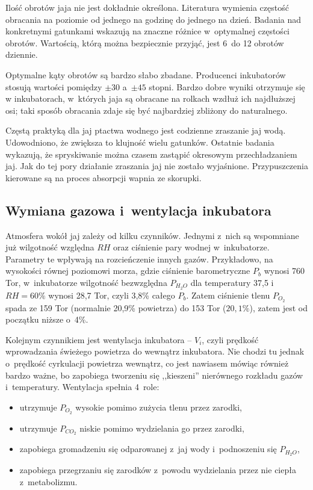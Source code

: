 Ilość obrotów jaja nie jest dokładnie określona. Literatura wymienia częstość
obracania na poziomie od jednego na godzinę do jednego na dzień. Badania nad
konkretnymi gatunkami wskazują na znaczne różnice w~optymalnej częstości
obrotów. Wartością, którą można bezpiecznie przyjąć, jest 6~do 12 obrotów
dziennie.

Optymalne kąty obrotów są bardzo słabo zbadane. Producenci inkubatorów stosują
wartości pomiędzy $\pm 30$ a~$\pm 45$ stopni. Bardzo dobre wyniki otrzymuje się
w inkubatorach, w~których jaja są obracane na rolkach wzdłuż ich najdłuższej
osi; taki sposób obracania zdaje się być najbardziej zbliżony do naturalnego.

Częstą praktyką dla jaj ptactwa wodnego jest codzienne zraszanie jaj wodą.
Udowodniono, że zwiększa to klujność wielu gatunków. Ostatnie badania wykazują,
że spryskiwanie można czasem zastąpić okresowym przechładzaniem jaj. Jak do tej
pory działanie zraszania jaj nie zostało wyjaśnione. Przypuszczenia kierowane są
na proces absorpcji wapnia ze skorupki.

\subsection{Wymiana gazowa i~wentylacja inkubatora}
Atmosfera wokół jaj zależy od kilku czynników. Jednymi z~nich są wspomniane już
wilgotność względna $RH$ oraz ciśnienie pary wodnej w~inkubatorze. Parametry te
wpływają na rozcieńczenie innych gazów. Przykładowo, na wysokości równej
poziomowi morza, gdzie ciśnienie barometryczne $P_b$ wynosi 760 Tor,
w~inkubatorze wilgotność bezwzględna $P_{H_{2}O}$ dla temperatury 37,5\st{} i~$RH
= 60\%$  wynosi 28,7 Tor, czyli 3,8\% całego $P_b$. Zatem ciśnienie tlenu
$P_{O_2}$ spada ze 159 Tor (normalnie 20,9\% powietrza) do 153 Tor ($20,1\%$),
zatem jest od początku niższe o~4\%.

Kolejnym czynnikiem jest wentylacja inkubatora  -- $V_i$, czyli prędkość
wprowadzania świeżego powietrza do wewnątrz inkubatora. Nie chodzi tu jednak
o~prędkość cyrkulacji powietrza wewnątrz, co jest nawiasem mówiąc również bardzo
ważne, bo zapobiega tworzeniu się ,,kieszeni'' nierównego rozkładu gazów
i~temperatury. Wentylacja spełnia 4~role:
\begin{itemize}
	\item utrzymuje $P_{O_2}$ wysokie pomimo zużycia tlenu przez zarodki,
	\item utrzymuje $P_{CO_2}$ niskie pomimo wydzielania go przez zarodki,
	\item zapobiega gromadzeniu się odparowanej z~jaj wody i~podnoszeniu się
		$P_{H_{2}O}$,
	\item zapobiega przegrzaniu się zarodków z~powodu wydzielania przez nie ciepła
		z~metabolizmu.
\end{itemize}

